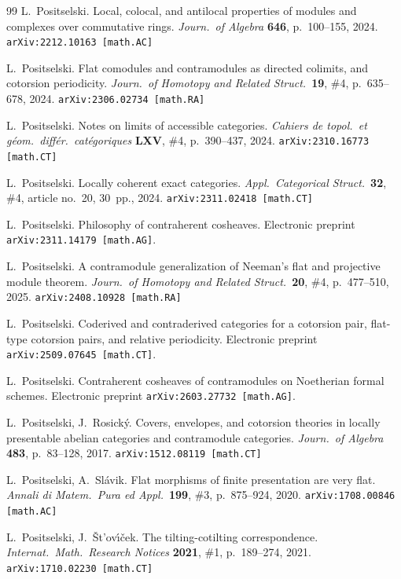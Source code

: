 \documentclass[12pt,a4paper]{amsart}
\newcommand{\+}{\protect\nobreakdash-}
\renewcommand{\:}{\colon}
\theoremstyle{plain}
\theoremstyle{definition}
\begin{document}
\begin{thebibliography}{99}
 L.~Positselski.
   Local, colocal, and antilocal properties of modules and complexes
over commutative rings.
\textit{Journ.\ of Algebra} \textbf{646}, p.~100--155, 2024.
\texttt{arXiv:2212.10163 [math.AC]}

 L.~Positselski.
   Flat comodules and contramodules as directed colimits, and cotorsion
periodicity.
\textit{Journ.\ of Homotopy and Related Struct.}\ \textbf{19}, \#4,
p.~635--678, 2024.  \texttt{arXiv:2306.02734 [math.RA]}

 L.~Positselski.
   Notes on limits of accessible categories.
\textit{Cahiers de topol.\ et g\'eom.\ diff\'er.\ cat\'egoriques}
\textbf{LXV}, \#4, p.~390--437, 2024.
\texttt{arXiv:2310.16773 [math.CT]}

 L.~Positselski.
   Locally coherent exact categories.
\textit{Appl.\ Categorical Struct.}\ \textbf{32}, \#4, article no.~20,
30~pp., 2024.  \texttt{arXiv:2311.02418 [math.CT]}

 L.~Positselski.
   Philosophy of contraherent cosheaves.
Electronic preprint \texttt{arXiv:2311.14179 [math.AG]}.

 L.~Positselski.
   A contramodule generalization of Neeman's flat and projective module
theorem.
\textit{Journ.\ of Homotopy and Related Struct.}\ \textbf{20}, \#4,
p.~477--510, 2025.  \texttt{arXiv:2408.10928 [math.RA]}

 L.~Positselski.
   Coderived and contraderived categories for a cotorsion pair,
flat-type cotorsion pairs, and relative periodicity.
Electronic preprint \texttt{arXiv:2509.07645 [math.CT]}.

 L.~Positselski.
   Contraherent cosheaves of contramodules on Noetherian formal schemes.
Electronic preprint \texttt{arXiv:2603.27732 [math.AG]}.

 L.~Positselski, J.~Rosick\'y.
   Covers, envelopes, and cotorsion theories in locally presentable
abelian categories and contramodule categories.
\textit{Journ.\ of Algebra} \textbf{483}, p.~83--128, 2017.
\texttt{arXiv:1512.08119 [math.CT]}

 L.~Positselski, A.~Sl\'avik.
   Flat morphisms of finite presentation are very flat.
\textit{Annali di Matem.\ Pura ed Appl.}\ \textbf{199}, \#3,
p.~875--924, 2020.  \texttt{arXiv:1708.00846 [math.AC]}

 L.~Positselski, J.~\v St\!'ov\'\i\v cek.
   The tilting-cotilting correspondence.
\textit{Internat.\ Math.\ Research Notices} \textbf{2021}, \#1,
p.~189--274, 2021.  \texttt{arXiv:1710.02230 [math.CT]}


\end{thebibliography}
\end{document}
